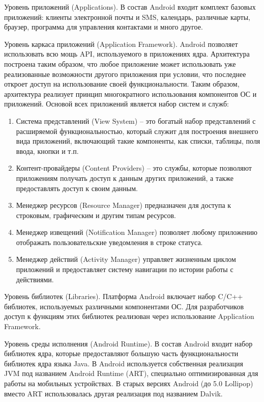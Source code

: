 Уровень приложений (Applications).
В состав Android входит комплект базовых приложений: клиенты электронной почты и SMS, календарь, различные карты, браузер, программа для управления контактами и много другое. 

Уровень каркаса приложений (Application Framework). Android позволяет использовать всю мощь API, используемого в приложениях ядра. Архитектура построена таким образом, что любое приложение может использовать уже реализованные возможности другого приложения при условии, что последнее откроет доступ на использование своей функциональности. Таким образом, архитектура реализует принцип многократного использования компонентов ОС и приложений. Основой всех приложений является набор систем и служб:
\begin{enumerate}
	\item Система представлений (View System) – это богатый набор представлений с расширяемой функциональностью, который служит для построения внешнего вида приложений, включающий такие компоненты, как списки, таблицы, поля ввода, кнопки и т.п.
	\item Контент-провайдеры (Content Providers) – это службы, которые позволяют приложениям получать доступ к данным других приложений, а также предоставлять доступ к своим данным.
	\item Менеджер ресурсов (Resource Manager) предназначен для доступа к строковым, графическим и другим типам ресурсов.
	\item Менеджер извещений (Notification Manager) позволяет любому приложению отображать пользовательские уведомления в строке статуса.
	\item Менеджер действий (Activity Manager) управляет жизненным циклом приложений и предоставляет систему навигации по истории работы с действиями.
\end{enumerate}

Уровень библиотек (Libraries). Платформа Android включает набор C/C++ библиотек, используемых различными компонентами ОС. Для разработчиков доступ к функциям этих библиотек реализован через использование Application Framework.

Уровень среды исполнения (Android Runtime). В состав Android входит набор библиотек ядра, которые предоставляют большую часть функциональности библиотек ядра языка Java. В Android используется собственная реализация JVM под названием Android Runtime (ART), специально оптимизированная для работы на мобильных устройствах. В старых версиях Android (до 5.0 Lollipop) вместо ART использовалась другая реализация под названием Dalvik.

